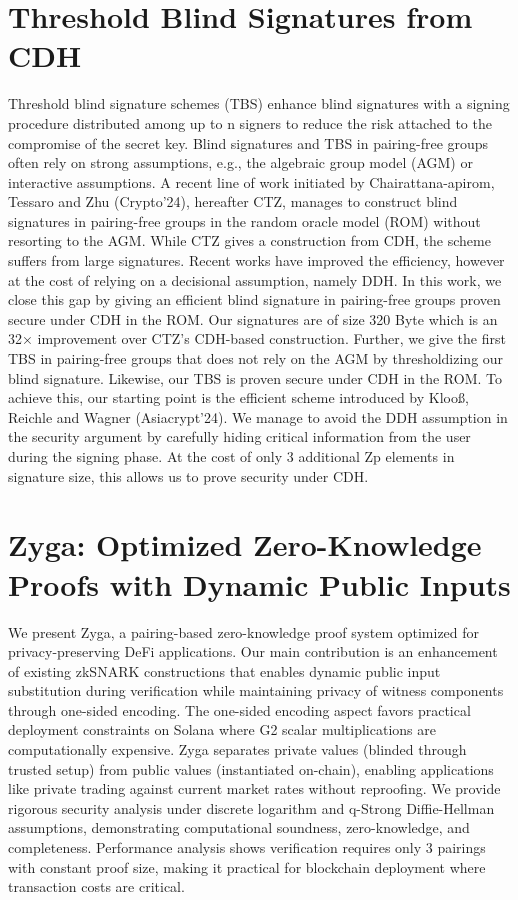 \documentclass[11pt,oneside]{book}
\theoremstyle{definition}
\theoremstyle{remark}
\theoremstyle{plain}
\begin{document}
\section{\cite{cryptoeprint:2025/1798} Threshold Blind Signatures from CDH}
Threshold blind signature schemes (TBS) enhance blind signatures with a signing procedure distributed among up to n signers to reduce the risk attached to the compromise of the secret key. Blind signatures and TBS in pairing-free groups often rely on strong assumptions, e.g., the algebraic group model (AGM) or interactive assumptions. A recent line of work initiated by Chairattana-apirom, Tessaro and Zhu (Crypto'24), hereafter CTZ, manages to construct blind signatures in pairing-free groups in the random oracle model (ROM) without resorting to the AGM. While CTZ gives a construction from CDH, the scheme suffers from large signatures. Recent works have improved the efficiency, however at the cost of relying on a decisional assumption, namely DDH. In this work, we close this gap by giving an efficient blind signature in pairing-free groups proven secure under CDH in the ROM. Our signatures are of size 320 Byte which is an 32× improvement over CTZ’s CDH-based construction. Further, we give the first TBS in pairing-free groups that does not rely on the AGM by thresholdizing our blind signature. Likewise, our TBS is proven secure under CDH in the ROM. To achieve this, our starting point is the efficient scheme introduced by Klooß, Reichle and Wagner (Asiacrypt'24). We manage to avoid the DDH assumption in the security argument by carefully hiding critical information from the user during the signing phase. At the cost of only 3 additional Zp elements in signature size, this allows us to prove security under CDH.

\section{\cite{cryptoeprint:2025/1802} Zyga: Optimized Zero-Knowledge Proofs with Dynamic Public Inputs}
We present Zyga, a pairing-based zero-knowledge proof system optimized for privacy-preserving DeFi applications. Our main contribution is an enhancement of existing zkSNARK constructions that enables dynamic public input substitution during verification while maintaining privacy of witness components through one-sided encoding. The one-sided encoding aspect favors practical deployment constraints on Solana where G2 scalar multiplications are computationally expensive. Zyga separates private values (blinded through trusted setup) from public values (instantiated on-chain), enabling applications like private trading against current market rates without reproofing. We provide rigorous security analysis under discrete logarithm and q-Strong Diffie-Hellman assumptions, demonstrating computational soundness, zero-knowledge, and completeness. Performance analysis shows verification requires only 3 pairings with constant proof size, making it practical for blockchain deployment where transaction costs are critical.
\end{document}
